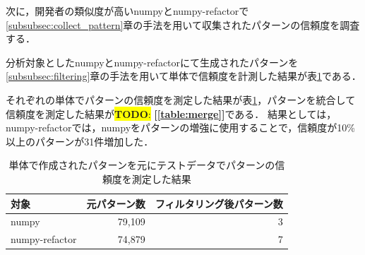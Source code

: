 \documentclass[T,J]{fose} %
\newcommand{\todo}[1]{\colorbox{yellow}{{\bf TODO}:}{\color{red} {\textbf{[#1]}}}}
\begin{document}
次に，開発者の類似度が高いnumpyとnumpy-refactorで\ref{subsubsec:collect_pattern}章の手法を用いて収集されたパターンの信頼度を調査する．

分析対象としたnumpyとnumpy-refactorにて生成されたパターンを\ref{subsubsec:filtering}章の手法を用いて単体で信頼度を計測した結果が表\ref{table:single}である．

それぞれの単体でパターンの信頼度を測定した結果が表\ref{table:single}，パターンを統合して信頼度を測定した結果が\todo{\ref{table:merge}}である．
結果としては，numpy-refactorでは，numpyをパターンの増強に使用することで，信頼度が10\%以上のパターンが31件増加した．

\begin{table}[t]
\centering
\caption{単体で作成されたパターンを元にテストデータでパターンの信頼度を測定した結果}
\label{table:single}
\begin{tabular}{l|rr}
\hline\hline
対象            & \multicolumn{1}{l}{元パターン数} & \multicolumn{1}{l}{フィルタリング後パターン数} \\ \hline
numpy           & 79,109                             & 3                                     \\ 
numpy-refactor  & 74,879                             & 7                                     \\ \hline
\end{tabular}
\end{table}
\end{document}
